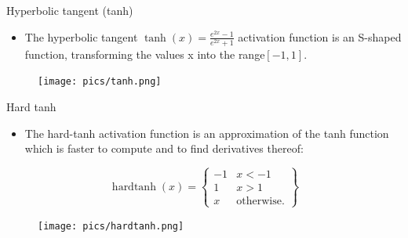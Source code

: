 \documentclass[handout]{beamer}
\begin{document}
\begin{frame}{Hyperbolic tangent (tanh)}
\begin{scriptsize}
\begin{itemize}
\item The hyperbolic tangent $\operatorname{tanh}(x) = \frac{e^{2x}-1}{e^{2x}+1}$ activation function is an S-shaped function, transforming the values x into the range$[-1, 1]$.
\end{itemize}

\begin{figure}[htb]
	\centering
	 \texttt{[image: pics/tanh.png]}
\end{figure}

\end{scriptsize}
\end{frame}




\begin{frame}{Hard tanh}
\begin{scriptsize}
\begin{itemize}
\item The hard-tanh activation function is an approximation of the tanh function which is faster to compute and to find derivatives thereof:
\end{itemize}

  \[
    \operatorname{hardtanh}(x) = \left\{\begin{array}{lr}
        -1 & x < -1\\
        1 & x > 1\\
        x & \text{otherwise.} 
        \end{array} \right\} 
  \]

\begin{figure}[htb]
	\centering
	 \texttt{[image: pics/hardtanh.png]}
\end{figure}

\end{scriptsize}
\end{frame}
\end{document}
